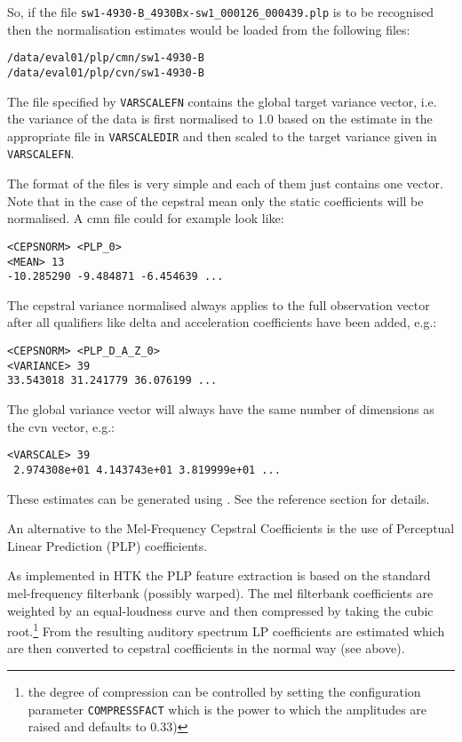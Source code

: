So, if the file \verb|sw1-4930-B_4930Bx-sw1_000126_000439.plp| is to be
recognised then the normalisation estimates would be loaded from the
following files:

\begin{verbatim}
/data/eval01/plp/cmn/sw1-4930-B
/data/eval01/plp/cvn/sw1-4930-B
\end{verbatim}

The file specified by
\texttt{VARSCALEFN} contains the
global target variance vector, i.e. the variance of the data is first
normalised to 1.0 based on the estimate in the appropriate file in
\texttt{VARSCALEDIR} and then
scaled to the target variance given in
\texttt{VARSCALEFN}.

The format of the files is very simple and each of them just contains
one vector. Note that in the case of the cepstral mean only the static
coefficients will be normalised. A cmn file could for example look like:

\begin{verbatim}
<CEPSNORM> <PLP_0>
<MEAN> 13
-10.285290 -9.484871 -6.454639 ...
\end{verbatim}


The cepstral variance normalised always applies to the full
observation vector after all qualifiers like delta and acceleration
coefficients have been added, e.g.:

\begin{verbatim}
<CEPSNORM> <PLP_D_A_Z_0>
<VARIANCE> 39
33.543018 31.241779 36.076199 ...
\end{verbatim}

The global variance vector will always have the same number of
dimensions as the cvn vector, e.g.:

\begin{verbatim}
<VARSCALE> 39
 2.974308e+01 4.143743e+01 3.819999e+01 ...
\end{verbatim}

These estimates can be generated using . See the
reference section for details.

 

An alternative to the Mel-Frequency Cepstral Coefficients is the use
of Perceptual Linear Prediction (PLP) coefficients.

As implemented in HTK the PLP feature extraction is based on the
standard mel-frequency filterbank (possibly warped). The mel
filterbank coefficients are weighted by an equal-loudness curve and
then compressed by taking the cubic root.\footnote{the degree of
  compression can be controlled by setting the configuration parameter
  \texttt{COMPRESSFACT} which
  is the power to which the amplitudes are raised and defaults to
  0.33)} From the resulting auditory spectrum LP coefficients are
estimated which are then converted to cepstral coefficients in the
normal way (see above).


